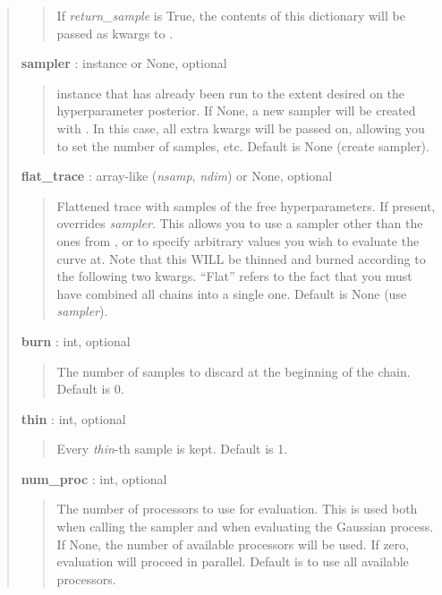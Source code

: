 \documentclass[letterpaper,10pt,english]{sphinxmanual}
\begin{document}
\begin{fulllineitems}
\begin{fulllineitems}
\begin{quote}
\begin{description}
\begin{quote}
If \emph{return\_sample} is True, the contents of this dictionary will be
passed as kwargs to {\hyperref[gptools:gptools.gaussian_process.GaussianProcess.draw_sample]{}}.
\end{quote}

\textbf{sampler} :  instance or None, optional
\begin{quote}

 instance that has already been run to the extent
desired on the hyperparameter posterior. If None, a new sampler will
be created with {\hyperref[gptools:gptools.gaussian_process.GaussianProcess.sample_hyperparameter_posterior]{}}. In this
case, all extra kwargs will be passed on, allowing you to set the
number of samples, etc. Default is None (create sampler).
\end{quote}

\textbf{flat\_trace} : array-like (\emph{nsamp}, \emph{ndim}) or None, optional
\begin{quote}

Flattened trace with samples of the free hyperparameters. If present,
overrides \emph{sampler}. This allows you to use a sampler other than the
ones from , or to specify arbitrary values you wish
to evaluate the curve at. Note that this WILL be thinned and burned
according to the following two kwargs. ``Flat'' refers to the fact
that you must have combined all chains into a single one. Default is
None (use \emph{sampler}).
\end{quote}

\textbf{burn} : int, optional
\begin{quote}

The number of samples to discard at the beginning of the chain.
Default is 0.
\end{quote}

\textbf{thin} : int, optional
\begin{quote}

Every \emph{thin}-th sample is kept. Default is 1.
\end{quote}

\textbf{num\_proc} : int, optional
\begin{quote}

The number of processors to use for evaluation. This is used both
when calling the sampler and when evaluating the Gaussian process.
If None, the number of available processors will be used. If zero,
evaluation will proceed in parallel. Default is to use all available
processors.
\end{quote}


\end{description}
\end{quote}
\end{fulllineitems}
\end{fulllineitems}
\end{document}
